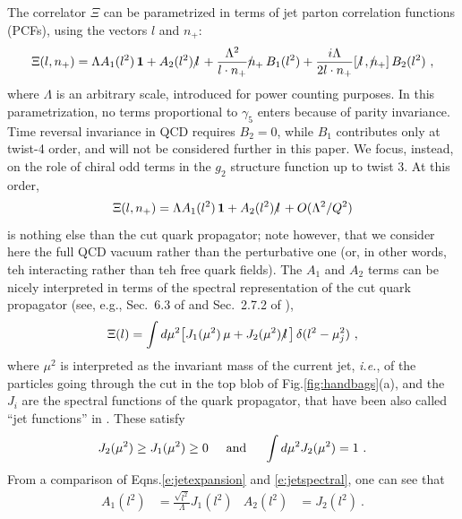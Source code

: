 \documentclass[preprintnumbers,floatfix,nofootinbib]{revtex4}
\newcommand{\lslash}{l \hspace{-0.19cm} / \,}
\newcommand{\nslash}{n \hspace{-0.24cm} / \,}
\begin{document}
The correlator $\Xi$ can be parametrized in terms of jet parton correlation
functions (PCFs), using the vectors $l$ and $n_+$: 
\begin{equation}
\Xi(l,n_+) = \Lambda A_1(l^2)\,{\bm 1} + A_2(l^2)\,\lslash 
+ \frac{\Lambda^2}{l \cdot n_{+}} \nslash_+ \, B_{1}(l^2)
+ \frac{i \Lambda}{2 l \cdot n_{+}} [\,\lslash,\nslash_+ ] \, B_{2}(l^2) \ ,
\label{e:jetexpansion}
\end{equation} 
where $\Lambda$ is an arbitrary scale, introduced for power counting purposes.
In this parametrization, no terms proportional to $\gamma_5$ enters because of parity invariance. Time reversal invariance in QCD requires $B_{2}=0$, while $B_{1}$ contributes only at twist-4 order, and will not be considered further in this paper. We focus, instead, on the role of chiral odd terms in the $g_2$ structure function up to twist 3. At this order, 
\begin{equation}
  \Xi(l,n_+) = \Lambda A_1(l^2)\,{\bm 1} + A_2(l^2)\,\lslash 
    + O(\Lambda^2/Q^2)
\label{e:jetexpansion-tw3}
\end{equation} 
is nothing else than the cut quark propagator; note however, that we consider
here the full QCD vacuum rather than the perturbative one (or, in other words, teh interacting rather than teh free quark fields).
The $A_1$ and $A_2$ terms can be nicely interpreted in terms of the spectral
representation of the cut quark propagator (see, e.g., Sec.~6.3 of
\cite{D'Hoker:2004aa} and Sec.~2.7.2 of \cite{Romao:2013aa}),
\begin{align} 
  \Xi(l) =  
  \int d \mu^2 \big[ J_1 (\mu^2)\,\mu + J_2 (\mu^2)\,\lslash \big] \,
  \delta(l^2 -\mu_j^2) \ ,
\label{e:jetspectral}
\end{align}
where $\mu^2$ is interpreted as the invariant mass of the current jet, {\it
  i.e.}, of the particles going through the cut in the top blob of
Fig.\ref{fig:handbags}(a), and the $J_i$ are the spectral functions of the
quark propagator, that have been also called ``jet functions'' in
\cite{Accardi:2008ne}. These satisfy
\begin{align}
  J_2(\mu^2) \geq J_1(\mu^2) \geq 0
  \hspace*{0.5cm} \text{and} \hspace*{0.5cm}
  \int d\mu^2 J_2(\mu^2) = 1 \ .
\label{eq:jetfnsprops}
\end{align}
From a comparison of Eqns.\eqref{e:jetexpansion} and \eqref{e:jetspectral}, one can see that 
\begin{align}
  A_1(l^2)&=\frac{\sqrt{l^2}}{\Lambda}J_1(l^2) & A_2(l^2)&=J_2(l^2) \ .
  \label{eq:jet_vs_spectral}
\end{align}
\end{document}
